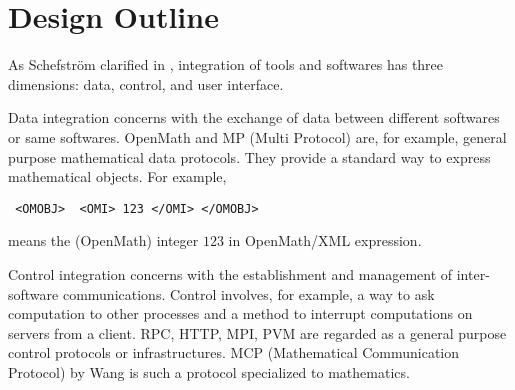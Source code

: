 
\section{Design Outline} 

As Schefstr\"om clarified in \cite{schefstrom},
integration of tools and softwares has three dimensions:
data, control, and user interface.

Data integration concerns with the exchange of data between different
softwares or same softwares.
OpenMath \cite{OpenMath} and MP (Multi Protocol) \cite{GKW} are,
for example, general purpose mathematical data protocols.
They provide a standard way to express mathematical objects.
For example,
\begin{verbatim}
 <OMOBJ>  <OMI> 123 </OMI> </OMOBJ>
\end{verbatim}
means the (OpenMath) integer $123$ in OpenMath/XML expression.

Control integration concerns with the establishment and management of
inter-software communications.
Control involves, for example, a way to ask computation to other processes
and a method to interrupt computations on servers from a client.
RPC, HTTP, MPI, PVM are regarded as a general purpose control protocols or
infrastructures.
MCP (Mathematical Communication Protocol)
by Wang \cite{iamc} is such a protocol specialized to mathematics.

